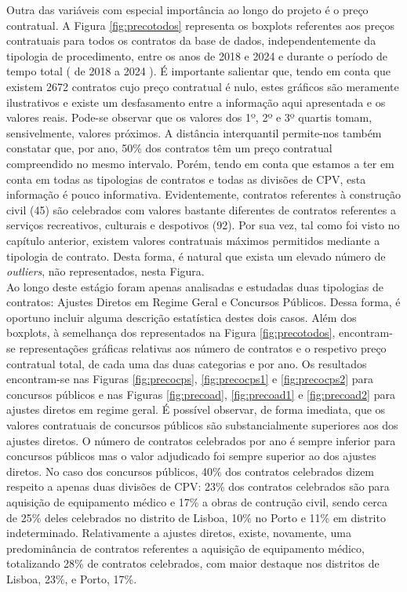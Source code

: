 Outra das variáveis com especial importância ao longo do projeto é o preço contratual. A Figura \ref{fig:precotodos} representa os boxplots referentes aos preços contratuais para todos os contratos da base de dados, independentemente da tipologia de procedimento, entre os anos de 2018 e 2024 e durante o período de tempo total ( de 2018 a 2024 ). É importante salientar que, tendo em conta que existem 2672 contratos cujo preço contratual é nulo, estes gráficos são meramente ilustrativos e existe um desfasamento entre a informação aqui apresentada e os valores reais. Pode-se observar que os valores dos 1º, 2º e 3º quartis tomam, sensivelmente, valores próximos. A distância interquantil permite-nos também constatar que, por ano, 50\% dos contratos têm um preço contratual compreendido no mesmo intervalo. Porém, tendo em conta que estamos a ter em conta em todas as tipologias de contratos e todas as divisões de CPV, esta informação é pouco informativa. Evidentemente, contratos referentes à construção civil (45) são celebrados com valores bastante diferentes de contratos referentes a serviços recreativos, culturais e despotivos (92). Por sua vez, tal como foi visto no capítulo anterior, existem valores contratuais máximos permitidos mediante a tipologia de contrato. Desta forma, é natural que exista um elevado número de \textit{outliers}, não representados, nesta Figura. \\
Ao longo deste estágio foram apenas analisadas e estudadas duas tipologias de contratos: Ajustes Diretos em Regime Geral e Concursos Públicos. Dessa forma, é oportuno incluir alguma descrição estatística destes dois casos. Além dos boxplots, à semelhança dos representados na Figura \ref{fig:precotodos}, encontram-se representações gráficas relativas aos número de contratos e o respetivo preço contratual total, de cada uma das duas categorias e por ano. Os resultados encontram-se nas Figuras \ref{fig:precocps}, \ref{fig:precocps1} e \ref{fig:precocps2} para concursos públicos e nas Figuras \ref{fig:precoad}, \ref{fig:precoad1} e \ref{fig:precoad2} para ajustes diretos em regime geral. É possível observar, de forma imediata, que os valores contratuais de concursos públicos são substancialmente superiores aos dos ajustes diretos. O número de contratos celebrados por ano é sempre inferior para concursos públicos mas o valor adjudicado foi sempre superior ao dos ajustes diretos. No caso dos concursos públicos, 40\% dos contratos celebrados dizem respeito a apenas duas divisões de CPV:  23\% dos contratos celebrados são para aquisição de equipamento médico e 17\% a obras de contrução civil, sendo cerca de 25\% deles celebrados no distrito de Lisboa, 10\% no Porto e 11\% em distrito indeterminado. Relativamente a ajustes diretos, existe, novamente, uma predominância de contratos referentes a aquisição de equipamento médico, totalizando 28\% de contratos celebrados, com maior destaque nos distritos de Lisboa, 23\%, e Porto, 17\%.


